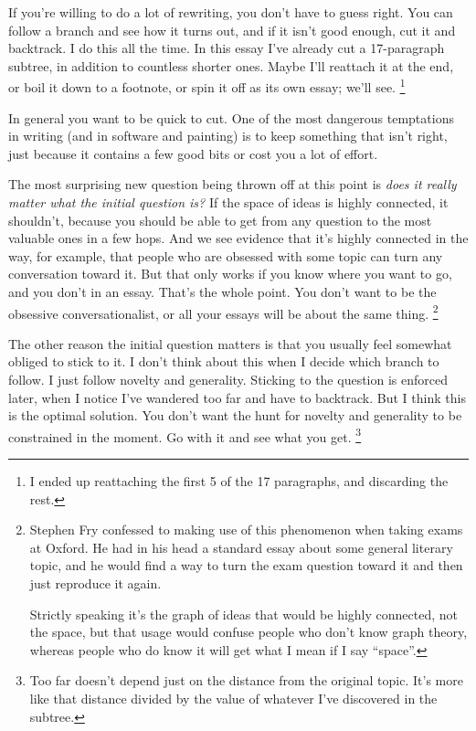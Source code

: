 If you're willing to do a lot of rewriting, you don't have to guess
right. You can follow a branch and see how it turns out, and if it isn't
good enough, cut it and backtrack. I do this all the time. In this essay
I've already cut a 17-paragraph subtree, in addition to countless
shorter ones. Maybe I'll reattach it at the end, or boil it down to a
footnote, or spin it off as its own essay; we'll see.
\footnote{I ended up reattaching the first 5 of the 17 paragraphs, and
discarding the rest.}

In general you want to be quick to cut. One of the most dangerous
temptations in writing (and in software and painting) is to keep
something that isn't right, just because it contains a few good bits or
cost you a lot of effort.

The most surprising new question being thrown off at this point is
\emph{does it really matter what the initial question is?} If the space
of ideas is highly connected, it shouldn't, because you should be able
to get from any question to the most valuable ones in a few hops. And we
see evidence that it's highly connected in the way, for example, that
people who are obsessed with some topic can turn any conversation toward
it. But that only works if you know where you want to go, and you don't
in an essay. That's the whole point. You don't want to be the obsessive
conversationalist, or all your essays will be about the same thing.
\footnote{Stephen Fry confessed to making use of this phenomenon when
taking exams at Oxford. He had in his head a standard essay about some
general literary topic, and he would find a way to turn the exam
question toward it and then just reproduce it again.

Strictly speaking it's the graph of ideas that would be highly
connected, not the space, but that usage would confuse people who don't
know graph theory, whereas people who do know it will get what I mean if
I say ``space''.}

The other reason the initial question matters is that you usually feel
somewhat obliged to stick to it. I don't think about this when I decide
which branch to follow. I just follow novelty and generality. Sticking
to the question is enforced later, when I notice I've wandered too far
and have to backtrack. But I think this is the optimal solution. You
don't want the hunt for novelty and generality to be constrained in the
moment. Go with it and see what you get. \footnote{Too far doesn't depend just on the distance from the original
topic. It's more like that distance divided by the value of whatever
I've discovered in the subtree.}

